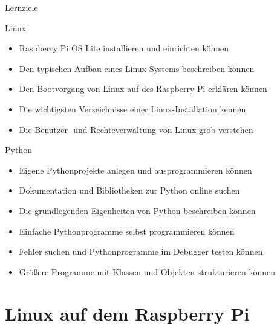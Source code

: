 {
\footnotesize

\begin{frame}{Lernziele}
    \begin{block}{Linux}
        \begin{itemize}
            \item Raspberry Pi OS Lite installieren und einrichten können
            \item Den typischen Aufbau eines Linux-Systems beschreiben können
            \item Den Bootvorgang von Linux auf des Raspberry Pi erklären können
            \item Die wichtigsten Verzeichnisse einer Linux-Installation kennen
            \item Die Benutzer- und Rechteverwaltung von Linux grob verstehen
        \end{itemize}
    \end{block}

    \begin{block}{Python}
        \begin{itemize}
            \item Eigene Pythonprojekte anlegen und ausprogrammieren können
            \item Dokumentation und Bibliotheken zur Python online suchen
            \item Die grundlegenden Eigenheiten von Python beschreiben können
            \item Einfache Pythonprogramme selbst programmieren können
            \item Fehler suchen und Pythonprogramme im Debugger testen können
            \item Größere Programme mit Klassen und Objekten strukturieren können
        \end{itemize}
    \end{block}
\end{frame}
}

\section{Linux auf dem Raspberry Pi}

